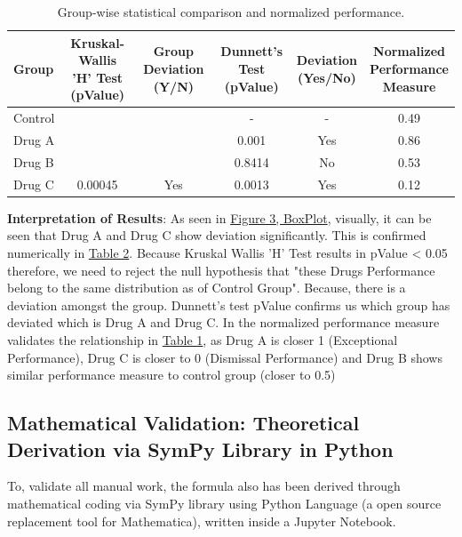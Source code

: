 \documentclass[man,floatsintext]{apa7}
\begin{document}
\begin{table}[!htbp]
	\centering
	\renewcommand{\arraystretch}{1.3}
	\begin{tabular}{lccccc}
		\toprule
		\textbf{Group} &
		\makecell{\textbf{Kruskal-Wallis} \\ \textbf{'H' Test (pValue)}} &
		\makecell{\textbf{Group} \\ \textbf{Deviation (Y/N)}} &
		\makecell{\textbf{Dunnett's} \\ \textbf{Test (pValue)}} &
		\makecell{\textbf{Deviation} \\ \textbf{(Yes/No)}} &
		\makecell{\textbf{Normalized} \\ \textbf{Performance} \\ \textbf{Measure}} \\
		\midrule
		Control &         &     & -      & -    & 0.49 \\
		Drug A  &         &     & 0.001  & Yes  & 0.86 \\
		Drug B  &         &     & 0.8414 & No   & 0.53 \\
		Drug C  & \multirow{-3}{*}{0.00045} & \multirow{-3}{*}{Yes} & 0.0013 & Yes & 0.12 \\
		\bottomrule
	\end{tabular}
	\vspace{5pt}
	\caption{Group-wise statistical comparison and normalized performance.}
	\label{table:results-simulated-data}
\end{table}

\textbf{Interpretation of Results}:
As seen in  \hyperref[fig:box-plot]{Figure 3, BoxPlot}, visually, it can be seen that Drug A and Drug C show deviation significantly. This is confirmed numerically in \hyperref[table:results-simulated-data]{Table 2}. Because Kruskal Wallis 'H' Test results in pValue < 0.05 therefore, we need to reject the null hypothesis that "these Drugs Performance belong to the same distribution as of Control Group". Because, there is a deviation amongst the group. Dunnett's test pValue confirms us which group has deviated which is Drug A and Drug C. In the normalized performance measure validates the relationship in \hyperref[table:p-value-relationship]{Table 1}, as Drug A is closer 1 (Exceptional Performance), Drug C is closer to 0 (Dismissal Performance) and Drug B shows similar performance measure to control group (closer to 0.5)

\subsection{Mathematical Validation: Theoretical Derivation via SymPy Library in Python}
To, validate all manual work, the formula also has been derived through mathematical coding via SymPy library using Python Language (a open source replacement tool for Mathematica), written inside a Jupyter Notebook.
\end{document}
